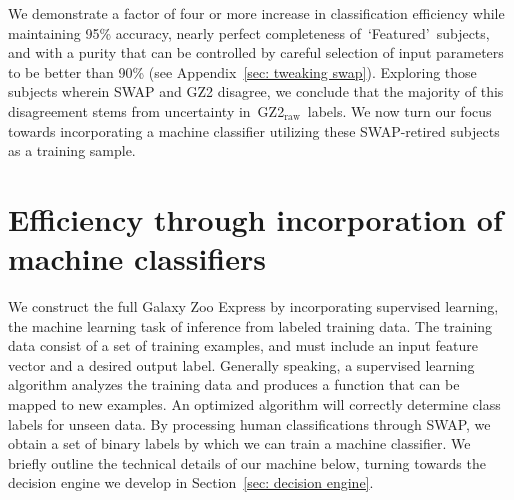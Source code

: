 \documentclass[twocolumn]{aastex6}
\newcommand{\feat}{`Featured'}
\newcommand{\raw}{GZ2$_{\text{raw}}$}
\begin{document}
We demonstrate a factor of four or more increase in 
classification efficiency while maintaining 95\% accuracy, nearly perfect 
completeness of~\feat~subjects, and with a purity that can be controlled by careful 
selection of input parameters to be better than 90\% (see Appendix~\ref{sec: tweaking swap}).
Exploring those subjects wherein SWAP and GZ2 disagree, we conclude that 
the majority of this disagreement stems from uncertainty in~\raw~labels.
We now turn our focus towards incorporating a machine
classifier utilizing these SWAP-retired subjects as a training sample. 


\section{Efficiency through incorporation of machine classifiers} \label{sec: machine}

We construct the full Galaxy Zoo Express by incorporating supervised 
learning, the machine learning task of inference from labeled training data. 
The training data consist of a set of training examples, and must include
an input feature vector and a desired output label.  Generally speaking,
a supervised learning algorithm analyzes the training data and produces a 
function that can be mapped to new examples. An optimized algorithm will 
correctly determine class labels for unseen data. By processing human classifications 
through SWAP, we obtain a set of binary labels by which we can train a machine 
classifier. We briefly outline the technical details of our machine below,  turning
towards the decision engine we develop in Section~\ref{sec: decision engine}. 



\end{document}
